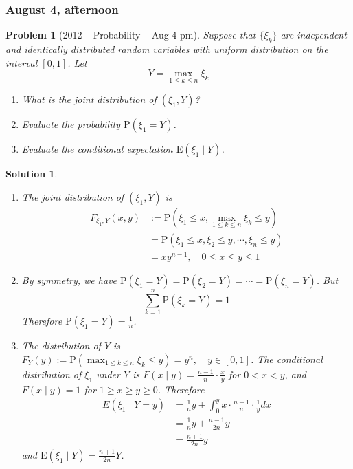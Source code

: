\documentclass[12pt]{amsart}
\newtheorem{problem}{Problem}
\newtheorem*{solution}{Solution}
\begin{document}
\subsubsection*{August 4, afternoon}
\begin{problem}[2012 -- Probability -- Aug 4 pm]
Suppose that $\{\xi_k\}$ are independent and identically distributed random variables with uniform distribution on the interval $[0,1]$. Let
$$
Y=\max _{1 \leq k \leq n} \xi_k
$$
\begin{enumerate}[label=(\alph*)]
\item What is the joint distribution of $(\xi_1, Y)$?
\item Evaluate the probability $\mathrm{P}(\xi_1=Y)$.
\item Evaluate the conditional expectation $\mathrm{E}(\xi_1 \mid Y)$.
\end{enumerate}
\end{problem}
\begin{solution}
\begin{enumerate}[label=(\alph*)]
\item The joint distribution of $(\xi_1, Y)$ is
\begin{align*}
F_{\xi_1, Y}(x, y) & :=\mathrm{P}(\xi_1 \leq x, \max _{1 \leq k \leq n} \xi_k \leq y) \\
& =\mathrm{P}(\xi_1 \leq x, \xi_2 \leq y, \cdots, \xi_n \leq y) \\
& =x y^{n-1}, \quad 0 \leq x \leq y \leq 1
\end{align*}
\item By symmetry, we have $\mathrm{P}(\xi_1=Y)=\mathrm{P}(\xi_2=Y)=\cdots=\mathrm{P}(\xi_n=Y)$. But
$$
\sum_{k=1}^n \mathrm{P}(\xi_k=Y)=1
$$
Therefore $\mathrm{P}(\xi_1=Y)=\frac{1}{n}$.
\item The distribution of $Y$ is $F_Y(y):=\mathrm{P}(\max _{1 \leq k \leq n} \xi_k \leq y)=y^n, \quad y \in[0,1]$. The conditional distribution of $\xi_1$ under $Y$ is $F(x \mid y)=\frac{n-1}{n} \cdot \frac{x}{y}$ for $0<x<y$, and $F(x \mid y)=1$ for $1 \geq x \geq y \geq 0$. Therefore
\begin{align*}
E(\xi_1 \mid Y=y) & =\frac{1}{n} y+\int_0^y x \cdot \frac{n-1}{n} \cdot \frac{1}{y} d x \\
& =\frac{1}{n} y+\frac{n-1}{2 n} y \\
& =\frac{n+1}{2 n} y
\end{align*}
and $\mathrm{E}(\xi_1 \mid Y)=\frac{n+1}{2 n} Y$.
\end{enumerate}
\end{solution}
\end{document}

